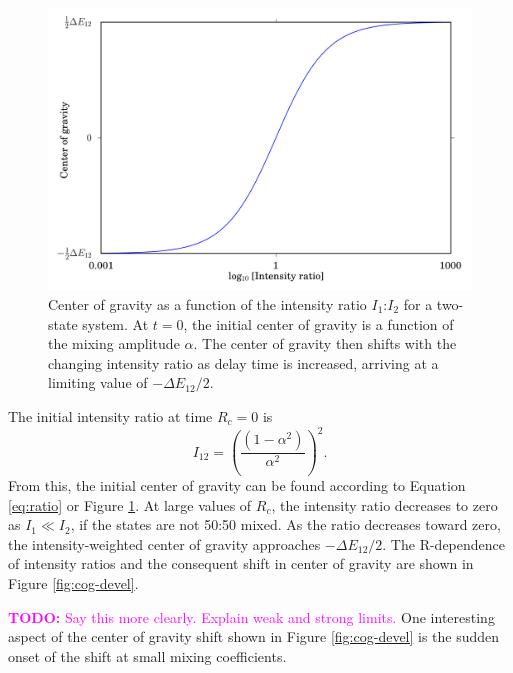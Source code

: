\documentclass[12pt,draft]{mitthesis}
\newcommand{\TODO} [1]{\textcolor{magenta}{\textbf{TODO:} #1}}
\begin{document}
\begin{figure}
  \caption{Center of gravity as a function of the intensity ratio
    $I_1$:$I_2$ for a two-state system.  At $t=0$, the initial center
    of gravity is a function of the mixing amplitude $\alpha$.  The
    center of gravity then shifts with the changing intensity ratio as
    delay time is increased, arriving at a limiting value of $-\Delta
    E_{12}/2$.}
  \label{fig:ratio}
  \centering
  \includegraphics[width=6in]{cog-from-ratio.png}
\end{figure}

The initial intensity ratio at time $R_c=0$ is
\begin{equation}
  I_{12} = 
  \left(
    \frac{(1 - \alpha^2)}{\alpha^2}
  \right)^2.
\end{equation}
From this, the initial center of gravity can be found according to
Equation \ref{eq:ratio} or Figure \ref{fig:ratio}.  At large values of
$R_c$, the intensity ratio decreases to zero as $I_1 \ll I_2$, if the
states are not 50:50 mixed.  As the ratio decreases toward zero, the
intensity-weighted center of gravity approaches $-\Delta E_{12} / 2$.
The R-dependence of intensity ratios and the consequent shift in
center of gravity are shown in Figure \ref{fig:cog-devel}.  

\TODO{Say this more clearly.  Explain weak and strong limits.} One
interesting aspect of the center of gravity shift shown in Figure
\ref{fig:cog-devel} is the sudden onset of the shift at small mixing
coefficients.
\end{document}
